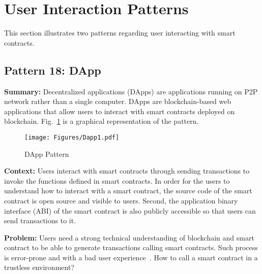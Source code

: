 \section{User Interaction Patterns}
\label{sec:deploymentPatttern}

This section illustrates two patterns regarding user interacting with smart contracts.


\subsection{\textbf{Pattern 18: DApp}}
\label{sec:DApp}

\noindent \textbf{Summary:} Decentralized applications (DApps) are applications running on P2P network rather than a single computer. DApps are blockchain-based web applications that allow users to interact with smart contracts deployed on blockchain. Fig.~\ref{fig:Dapp} is a graphical representation of the pattern.


\begin{figure}[t]
\begin{center}
\texttt{[image: Figures/Dapp1.pdf]}
\caption{DApp Pattern}\label{fig:Dapp}
\end{center}
\end{figure}


\vspace{0.5em}\noindent \textbf{Context:} 
Users interact with smart contracts through sending transactions to invoke the functions defined in smart contracts. In order for the users to understand how to interact with a smart contract, the source code of the smart contract is open source and visible to users. Second, the application binary interface (ABI) of the smart contract is also publicly accessible so that users can send transactions to it. 

\vspace{0.5em}\noindent \textbf{Problem:} 
Users need a strong technical understanding of blockchain and smart contract to be able to generate transactions calling smart contracts. Such process is error-prone and with a bad user experience~\cite{patternICSA2018}. How to call a smart contract in a trustless environment?


